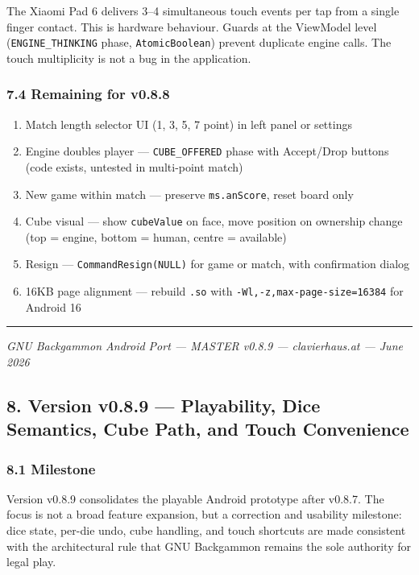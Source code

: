 \documentclass[11pt,a4paper]{article}
\providecommand{\tightlist}{\setlength{\itemsep}{2pt}\setlength{\parskip}{0pt}}
\begin{document}
The Xiaomi Pad 6 delivers 3--4 simultaneous touch events per tap from
a single finger contact. This is hardware behaviour. Guards at the
ViewModel level (\texttt{ENGINE\_THINKING} phase, \texttt{AtomicBoolean})
prevent duplicate engine calls. The touch multiplicity is not a bug in
the application.

\subsubsection{7.4 Remaining for v0.8.8}\label{next-v087}

\begin{enumerate}
\def\labelenumi{\arabic{enumi}.}
\tightlist
\item
  Match length selector UI (1, 3, 5, 7 point) in left panel or settings
\item
  Engine doubles player --- \texttt{CUBE\_OFFERED} phase with Accept/Drop
  buttons (code exists, untested in multi-point match)
\item
  New game within match --- preserve \texttt{ms.anScore}, reset board only
\item
  Cube visual --- show \texttt{cubeValue} on face, move position on
  ownership change (top = engine, bottom = human, centre = available)
\item
  Resign --- \texttt{CommandResign(NULL)} for game or match, with
  confirmation dialog
\item
  16KB page alignment --- rebuild \texttt{.so} with
  \texttt{-Wl,-z,max-page-size=16384} for Android 16
\end{enumerate}

\begin{center}\rule{0.5\linewidth}{0.5pt}\end{center}
\emph{GNU Backgammon Android Port --- MASTER v0.8.9 --- clavierhaus.at
--- June 2026}

\subsection{8. Version v0.8.9 --- Playability, Dice Semantics, Cube Path, and Touch Convenience}\label{version-v089}

\subsubsection{8.1 Milestone}

Version v0.8.9 consolidates the playable Android prototype after v0.8.7. The focus is not a broad feature expansion, but a correction and usability milestone: dice state, per-die undo, cube handling, and touch shortcuts are made consistent with the architectural rule that GNU Backgammon remains the sole authority for legal play.
\end{document}
